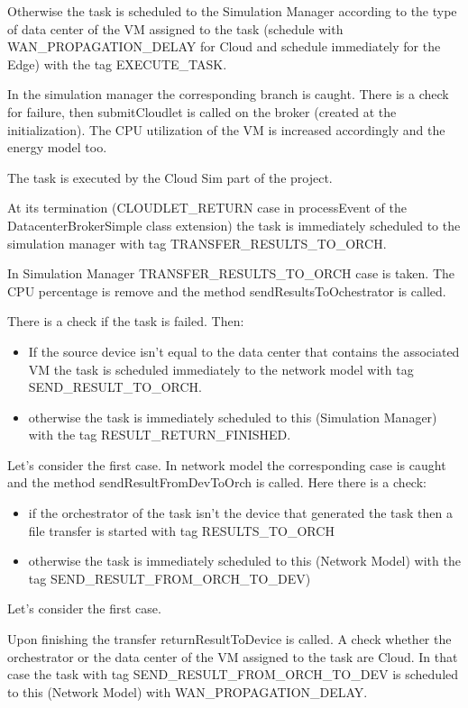 \documentclass[12pt]{report}
\begin{document}
Otherwise the task is scheduled to the Simulation Manager according to the type of data center of the VM assigned to the task (schedule with WAN\_PROPAGATION\_DELAY for Cloud and schedule immediately for the Edge) with the tag EXECUTE\_TASK.

In the simulation manager the corresponding branch is caught. There is a check for failure, then submitCloudlet is called on the broker (created at the initialization). The CPU utilization of the VM is increased accordingly and the energy model too.

The task is executed by the Cloud Sim part of the project.

At its termination (CLOUDLET\_RETURN case in processEvent of the DatacenterBrokerSimple class extension) the task is immediately scheduled to the simulation manager with tag TRANSFER\_RESULTS\_TO\_ORCH.

In Simulation Manager TRANSFER\_RESULTS\_TO\_ORCH case is taken. The CPU percentage is remove and the method sendResultsToOchestrator is called.

There is a check if the task is failed. Then:
\begin{itemize}
	\item If the source device isn't equal to the data center that contains the associated VM the task is scheduled immediately to the network model with tag SEND\_RESULT\_TO\_ORCH.
	\item otherwise the task is immediately scheduled to this (Simulation Manager) with the tag RESULT\_RETURN\_FINISHED.
\end{itemize}
Let's consider the first case.
In network model the corresponding case is caught and the method sendResultFromDevToOrch is called. Here there is a check:
\begin{itemize}
	\item if the orchestrator of the task isn't the device that generated the task then a file transfer is started with tag RESULTS\_TO\_ORCH
	\item otherwise the task is immediately scheduled to this (Network Model) with the tag SEND\_RESULT\_FROM\_ORCH\_TO\_DEV)
\end{itemize}
Let's consider the first case.

Upon finishing the transfer returnResultToDevice is called.
A check whether the orchestrator or the data center of the VM assigned to the task are Cloud. In that case the task with tag SEND\_RESULT\_FROM\_ORCH\_TO\_DEV is scheduled to this (Network Model) with WAN\_PROPAGATION\_DELAY.
\end{document}

